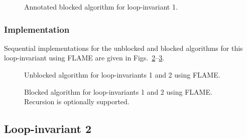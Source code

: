 \renewcommand{\afterupdate}{
\FlaTwoByOne{ 
B_0
}
{
\FlaTwoByOneSingleLine{ B_1 }{ B_2 }
} =
\FlaTwoByOne{ 
\hat{B}_0
}
{
\FlaTwoByOneSingleLine{ L_{11} \hat{B}_1 }{ L_{21} \hat{B}_1 + L_{22} \hat{B}_2 }
}
\wedge \ldots
}

\renewcommand{\update}{
\begin{minipage}[t]{4in}
\noindent
$ B_2 \becomes L_{21} B_1 + B_2 $\\
$ B_1 \becomes L_{11} B_1 $\\
\end{minipage}
}

\begin{figure}[htbp]
\worksheet
\caption{Annotated blocked algorithm for loop-invariant 1.}
\label{fig:ws:ltrmm_lln_blk}
\end{figure}
%

\subsubsection{Implementation}

Sequential implementations for the unblocked and blocked algorithms
for this loop-invariant using FLAME are given in
Figs.~\ref{fig:trmm_lln_lazy_unb}--\ref{fig:trmm_lln_lazy_blk}.

\begin{figure}[htbp]
\footnotesize
\begin{quote}
\end{quote}
\caption{Unblocked algorithm for loop-invariants 1 and 2 using FLAME.}
\label{fig:trmm_lln_lazy_unb}
\end{figure}

\begin{figure}[htbp]
\footnotesize
{}%
\begin{quote}
\end{quote}
\caption{Blocked algorithm for loop-invariants 1 and 2 using FLAME.
Recursion is optionally supported.}
\label{fig:trmm_lln_lazy_blk}
\end{figure}

\subsection{Loop-invariant 2}

